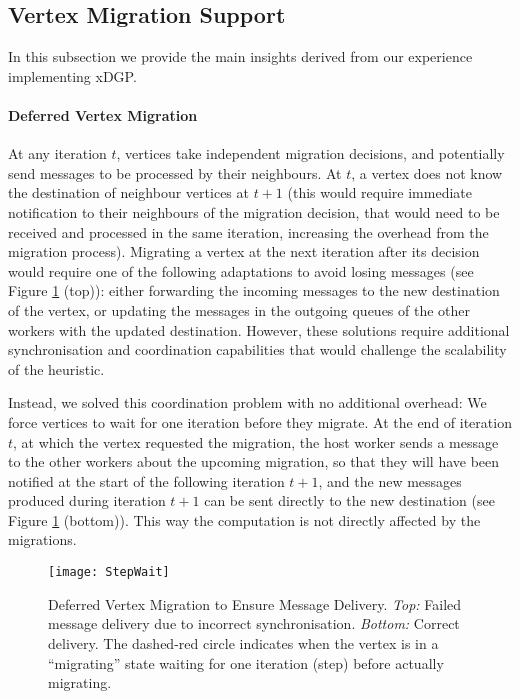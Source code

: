 \documentclass{sig-alternate-10pt}
\begin{document}
\subsection{Vertex Migration Support}

In this subsection we provide the main insights derived from our experience implementing xDGP.

\paragraph{\textbf{Deferred Vertex Migration}} At any iteration $t$, vertices take independent migration decisions, and potentially send messages to be processed by their neighbours. At $t$, a vertex does not know the destination of neighbour vertices at $t +1$ (this would require immediate notification to their neighbours of the migration decision, that would need to be received and processed in the same iteration, increasing the overhead from the migration process). Migrating a vertex at the next iteration after its decision would require one of the following adaptations to avoid losing messages (see Figure \ref{fig:dance} (top)): either forwarding the incoming messages to the new destination of the vertex, or updating the messages in the outgoing queues of the other workers with the updated destination. However, these solutions require additional synchronisation and coordination capabilities that would challenge the scalability of the  heuristic.

Instead, we solved this coordination problem with no additional overhead: We force vertices to wait for one iteration before they migrate. At the end of iteration $t$, at which the vertex requested the migration, the host  worker sends a message to the other workers about the upcoming migration, so that they will have been notified at the start of the following iteration $t +1 $, and the new messages produced during iteration $t+1$ can be sent directly to the new destination (see Figure \ref{fig:dance} (bottom)). This way the computation is not directly affected by the migrations.

\begin{figure}
 \centering
    \texttt{[image: StepWait]}
 \caption{ Deferred Vertex Migration to Ensure Message Delivery. \textit{Top: } Failed message delivery due to incorrect synchronisation. \textit{Bottom: } Correct delivery. The dashed-red circle indicates when the vertex is in a ``migrating'' state waiting for one iteration (step) before actually migrating.}
 \label{fig:dance}
 \vspace{-10pt}
\end{figure}
\end{document}
